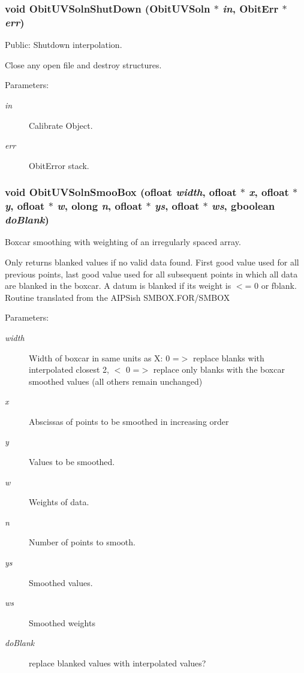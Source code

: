 \subsubsection{\setlength{\rightskip}{0pt plus 5cm}void Obit\-UVSoln\-Shut\-Down ({\bf Obit\-UVSoln} $\ast$ {\em in}, {\bf Obit\-Err} $\ast$ {\em err})}\label{ObitUVSoln_8h_a25}


Public: Shutdown interpolation. 

Close any open file and destroy structures. \begin{Desc}
\item[Parameters:]
\begin{description}
\item[{\em in}]Calibrate Object. \item[{\em err}]Obit\-Error stack. \end{description}
\end{Desc}
\subsubsection{\setlength{\rightskip}{0pt plus 5cm}void Obit\-UVSoln\-Smoo\-Box ({\bf ofloat} {\em width}, {\bf ofloat} $\ast$ {\em x}, {\bf ofloat} $\ast$ {\em y}, {\bf ofloat} $\ast$ {\em w}, {\bf olong} {\em n}, {\bf ofloat} $\ast$ {\em ys}, {\bf ofloat} $\ast$ {\em ws}, gboolean {\em do\-Blank})}\label{ObitUVSoln_8h_a32}


Boxcar smoothing with weighting of an irregularly spaced array. 

Only returns blanked values if no valid data found. First good value used for all previous points, last good value used for all subsequent points in which all data are blanked in the boxcar. A datum is blanked if its weight is $<$= 0 or fblank. Routine translated from the AIPSish SMBOX.FOR/SMBOX \begin{Desc}
\item[Parameters:]
\begin{description}
\item[{\em width}]Width of boxcar in same units as X: 0 =$>$ replace blanks with interpolated closest 2, $<$ 0 =$>$ replace only blanks with the boxcar smoothed values (all others remain unchanged) \item[{\em x}]Abscissas of points to be smoothed in increasing order \item[{\em y}]Values to be smoothed. \item[{\em w}]Weights of data. \item[{\em n}]Number of points to smooth. \item[{\em ys}]Smoothed values. \item[{\em ws}]Smoothed weights \item[{\em do\-Blank}]replace blanked values with interpolated values? \end{description}
\end{Desc}
